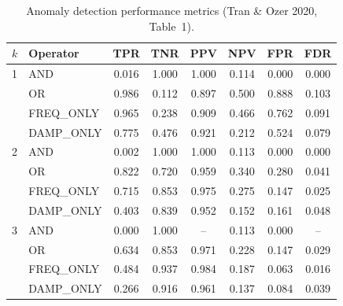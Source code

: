\begin{table}[htbp]
\centering
\small
\caption{Anomaly detection performance metrics (Tran \& Ozer 2020, Table~1).}
\label{tab:detection}
\begin{tabular}{llcccccc}
\toprule
$k$ & Operator & TPR & TNR & PPV & NPV & FPR & FDR \\
\midrule
1 & AND & 0.016 & 1.000 & 1.000 & 0.114 & 0.000 & 0.000 \\
 & OR & 0.986 & 0.112 & 0.897 & 0.500 & 0.888 & 0.103 \\
 & FREQ_ONLY & 0.965 & 0.238 & 0.909 & 0.466 & 0.762 & 0.091 \\
 & DAMP_ONLY & 0.775 & 0.476 & 0.921 & 0.212 & 0.524 & 0.079 \\
\midrule
2 & AND & 0.002 & 1.000 & 1.000 & 0.113 & 0.000 & 0.000 \\
 & OR & 0.822 & 0.720 & 0.959 & 0.340 & 0.280 & 0.041 \\
 & FREQ_ONLY & 0.715 & 0.853 & 0.975 & 0.275 & 0.147 & 0.025 \\
 & DAMP_ONLY & 0.403 & 0.839 & 0.952 & 0.152 & 0.161 & 0.048 \\
\midrule
3 & AND & 0.000 & 1.000 & -- & 0.113 & 0.000 & -- \\
 & OR & 0.634 & 0.853 & 0.971 & 0.228 & 0.147 & 0.029 \\
 & FREQ_ONLY & 0.484 & 0.937 & 0.984 & 0.187 & 0.063 & 0.016 \\
 & DAMP_ONLY & 0.266 & 0.916 & 0.961 & 0.137 & 0.084 & 0.039 \\
\midrule
\bottomrule
\end{tabular}
\end{table}